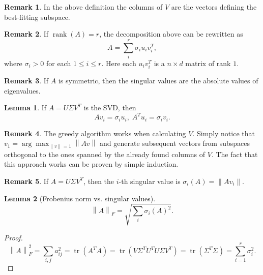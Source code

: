 \documentclass{article}
\theoremstyle{definition}
\newtheorem{lemma}{Lemma}[section]
\newtheorem{remark}{Remark}[section]
\begin{document}
  \begin{remark}
    In the above definition the columns of \( V \) are the vectors
    defining the best-fitting subspace.
  \end{remark}

  \begin{remark}
    If \( \operatorname{rank}(A) = r \), the decomposition above can
    be rewritten as
    \[
      A = \sum_{i}^{r} \sigma_{i}u_{i}v_{i}^{T},
    \]
    where \( \sigma_{i} > 0 \) for each \( 1 \leq i \leq r\).
    Here each \( u_{i}v_{i}^{T} \) is a \( n \times d \) matrix of rank \( 1 \).
  \end{remark}

  \begin{remark}
    If \( A \) is symmetric, then the singular values are the absolute
    values of eigenvalues.
  \end{remark}

  \begin{lemma}
    If \( A = U \Sigma V^{T} \) is the SVD, then
    \[
      Av_{i} = \sigma_{i} u_{i}, \; A^{T}u_{i} = \sigma_{i} v_{i}.
    \]
  \end{lemma}

  \begin{remark}
    The greedy algorithm works when calculating \( V \). Simply notice that
    \( v_{1} = \arg\max_{\left\|v\right\| = 1} \left\|Av\right\| \) and
    generate subsequent vectors from subspaces orthogonal to the ones
    spanned by the already found columns of \( V \).
    The fact that this approach works can be proven by simple induction.
  \end{remark}

  \begin{remark}
    If \( A = U \Sigma V^{T} \), then the \( i \)-th singular value is \(
    \sigma_i (A) = \left\|Av_{i}\right\| \).
  \end{remark}

  \begin{lemma}[Frobenius norm vs. singular values]
    \[
      \left\|A\right\|_{F} = \sqrt{\sum_{i}^{} \sigma_i (A)^{2}}.
    \]
  \end{lemma}

  \begin{proof}
    \[
      \left\| A \right\|^{2}_{F} = \sum_{i,j} a_{ij}^{2} =
      \operatorname{tr}(A^{T}A) = \operatorname{tr}(V \Sigma^{T} U^{T}
      U \Sigma V^{T}) = \operatorname{tr}(\Sigma^{T} \Sigma) =
      \sum_{i=1}^{r} \sigma_{i}^{2}.
    \]
  \end{proof}
\end{document}
